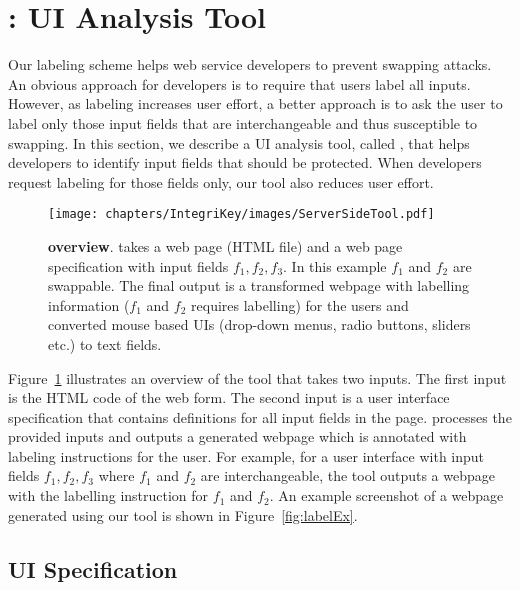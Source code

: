 \section{\tool: UI Analysis Tool}
\label{sec:integriTool}

Our labeling scheme helps web service developers to prevent swapping attacks. An obvious approach for developers is to require that users label all inputs. However, as labeling increases user effort, a better approach is to ask the user to label only those input fields that are interchangeable and thus susceptible to swapping. In this section, we describe a UI analysis tool, called \tool, that helps developers to identify input fields that should be protected. When developers request labeling for those fields only, our tool also reduces user effort.

\begin{figure}[t]
 \centering
 \texttt{[image: chapters/IntegriKey/images/ServerSideTool.pdf]}
 \caption[\tool overview]{\textbf{\tool overview}. \tool takes a web page (HTML file) and a web page specification with input fields $f_1, f_2, f_3$. In this example $f_1$ and $f_2$ are swappable. The final output is a transformed webpage with labelling information ($f_1$ and $f_2$ requires labelling) for the users and converted mouse based UIs (drop-down menus, radio buttons, sliders etc.) to text fields. 
 }
 \label{fig:tool}
\end{figure}

Figure~\ref{fig:tool} illustrates an overview of the tool that takes two inputs. The first input is the HTML code of the web form. The second input is a user interface specification that contains definitions for all input fields in the page. \tool processes the provided inputs and outputs a generated webpage which is annotated with labeling instructions for the user. For example, for a user interface with input fields $f_1, f_2, f_3$ where $f_1$ and $f_2$ are interchangeable, the tool outputs a webpage with the labelling instruction for $f_1$ and $f_2$. An example screenshot of a webpage generated using our tool is shown in Figure~\ref{fig:labelEx}.
 

\subsection{UI Specification} 
\label{sec:integriTool:specification}

